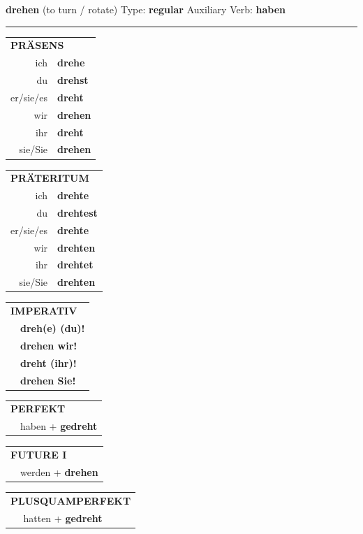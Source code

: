 \documentclass[10pt,a4paper]{revtex4-2}
\begin{document}
\begin{verbbox}
{\Large \bf drehen} (to turn / rotate) \hfill Type: \textbf{regular} \hfill Auxiliary Verb: \textbf{haben}

\vspace{5pt}
\hrule
\vspace{5pt}

\begin{tabular}{rl}
\multicolumn{2}{l}{\textbf{PRÄSENS}}\\
ich & \textbf{drehe}\\
du & \textbf{drehst}\\
er/sie/es & \textbf{dreht}\\
wir & \textbf{drehen}\\
ihr & \textbf{dreht}\\
sie/Sie & \textbf{drehen}\\
\end{tabular}
\hfill
\begin{tabular}{rl}
\multicolumn{2}{l}{\textbf{PRÄTERITUM}}\\
ich & \textbf{drehte}\\
du & \textbf{drehtest}\\
er/sie/es & \textbf{drehte}\\
wir & \textbf{drehten}\\
ihr & \textbf{drehtet}\\
sie/Sie & \textbf{drehten}\\
\end{tabular}
\hfill
\begin{tabular}{rl}
\multicolumn{2}{l}{\textbf{IMPERATIV}}\\
& \textbf{dreh(e) (du)!}\\
& \textbf{drehen wir!}\\
& \textbf{dreht (ihr)!}\\
& \textbf{drehen Sie!}\\
\end{tabular}

\vspace{10pt}

\begin{tabular}{rl}
\multicolumn{2}{l}{\textbf{PERFEKT}}\\
& haben + \textbf{gedreht}\\
\end{tabular}
\hfill
\begin{tabular}{rl}
\multicolumn{2}{l}{\textbf{FUTURE I}}\\
& werden + \textbf{drehen}\\
\end{tabular}
\hfill
\begin{tabular}{rl}
\multicolumn{2}{l}{\textbf{PLUSQUAMPERFEKT}}\\
& hatten + \textbf{gedreht}\\
\end{tabular}


\end{verbbox}
\end{document}
